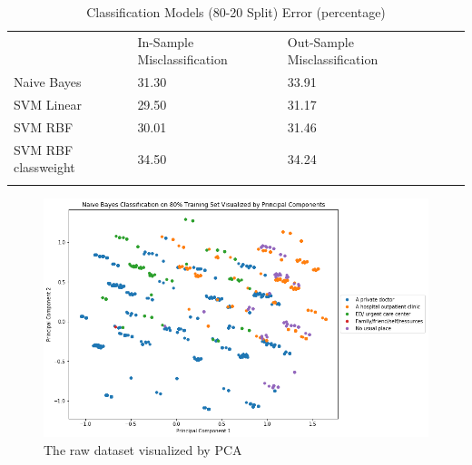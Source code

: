 \documentclass[10pt,twocolumn]{article}
\begin{document}
\begin{center}
\begin{table}[]
\centering
\caption{Classification Models (80-20 Split) Error (percentage)}
\label{my-label}
\begin{tabular}{lllll}
                & In-Sample Misclassification & Out-Sample Misclassification & \\
Naive Bayes        & 31.30              & 33.91                  & \\
SVM Linear    & 29.50              & 31.17               & \\
SVM RBF      & 30.01               & 31.46                & \\
SVM RBF classweight       & 34.50               & 34.24                  & \\
                &                           &                         &
\end{tabular}
\end{table}
\end{center}

\begin{figure}[!t]
  \begin{center}
    \includegraphics[width=6in]{PCA_NaiveBayes.png}
  \end{center}

  \caption{\small The raw dataset visualized by PCA}
  \label{fig-1}
\end{figure}
\end{document}
